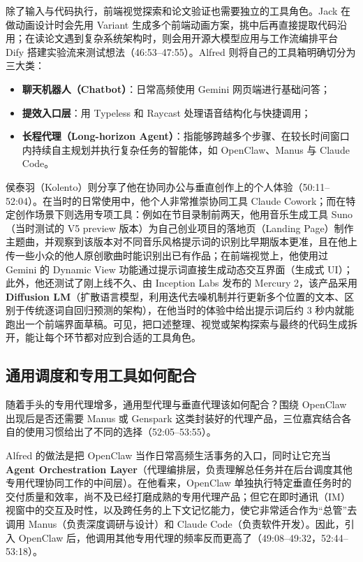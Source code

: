 \documentclass[UTF8,a4paper,11pt,fontset=fandol]{ctexart}
\begin{document}
除了输入与代码执行，前端视觉探索和论文验证也需要独立的工具角色。Jack 在做动画设计时会先用 Variant 生成多个前端动画方案，挑中后再直接提取代码沿用；在读论文遇到复杂系统架构时，则会用开源大模型应用与工作流编排平台 Dify 搭建实验流来测试想法（46:53–47:55）。Alfred 则将自己的工具箱明确切分为三大类：
\begin{itemize}
\item \textbf{聊天机器人（Chatbot）}：日常高频使用 Gemini 网页端进行基础问答；
\item \textbf{提效入口层}：用 Typeless 和 Raycast 处理语音结构化与快捷调用；
\item \textbf{长程代理（Long-horizon Agent）}：指能够跨越多个步骤、在较长时间窗口内持续自主规划并执行复杂任务的智能体，如 OpenClaw、Manus 与 Claude Code。
\end{itemize}

侯泰羽（Kolento）则分享了他在协同办公与垂直创作上的个人体验（50:11–52:04）。在当时的日常使用中，他个人非常推崇协同工具 Claude Cowork；而在特定创作场景下则选用专项工具：例如在节目录制前两天，他用音乐生成工具 Suno（当时测试的 V5 preview 版本）为自己创业项目的落地页（Landing Page）制作主题曲，并观察到该版本对不同音乐风格提示词的识别比早期版本更准，且在他上传一些小众的他人原创歌曲时能识别出已有作品；在前端视觉上，他使用过 Gemini 的 Dynamic View 功能通过提示词直接生成动态交互界面（生成式 UI）；此外，他还测试了刚上线不久、由 Inception Labs 发布的 Mercury 2，该产品采用 \textbf{Diffusion LM}（扩散语言模型，利用迭代去噪机制并行更新多个位置的文本、区别于传统逐词自回归预测的架构），在他当时的体验中给出提示词后约 3 秒内就能跑出一个前端界面草稿。可见，把口述整理、视觉或架构探索与最终的代码生成拆开，能让每个环节都对应到合适的工具角色。

\subsection{通用调度和专用工具如何配合}
随着手头的专用代理增多，通用型代理与垂直代理该如何配合？围绕 OpenClaw 出现后是否还需要 Manus 或 Genspark 这类封装好的代理产品，三位嘉宾结合各自的使用习惯给出了不同的选择（52:05–53:55）。

Alfred 的做法是把 OpenClaw 当作日常高频生活事务的入口，同时让它充当 \textbf{Agent Orchestration Layer}（代理编排层，负责理解总任务并在后台调度其他专用代理协同工作的中间层）。在他看来，OpenClaw 单独执行特定垂直任务时的交付质量和效率，尚不及已经打磨成熟的专用代理产品；但它在即时通讯（IM）视窗中的交互及时性，以及跨任务的上下文记忆能力，使它非常适合作为“总管”去调用 Manus（负责深度调研与设计）和 Claude Code（负责软件开发）。因此，引入 OpenClaw 后，他调用其他专用代理的频率反而更高了（49:08–49:32，52:44–53:18）。
\end{document}
